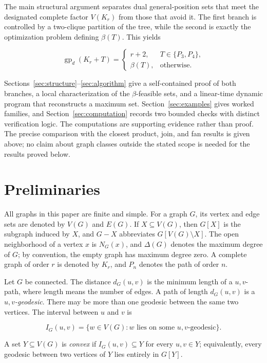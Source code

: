 \documentclass[11pt,a4paper]{article}
\numberwithin{equation}{section}
\begin{document}
The main structural argument separates dual general-position sets that
meet the designated complete factor \(V(K_r)\) from those that avoid it. The first
branch is controlled by a two-clique partition of the tree, while the
second is exactly the optimization problem defining \(\beta(T)\). This
yields

\[
\operatorname{gp}_d(K_r+T)=
\begin{cases}
r+2, & T\in\{P_3,P_4\},\\
\beta(T), & \text{otherwise}.
\end{cases}
\]

Sections~\ref{sec:structure}--\ref{sec:algorithm} give a self-contained proof of both branches, a local
characterization of the \(\beta\)-feasible sets, and a linear-time
dynamic program that reconstructs a maximum set. Section~\ref{sec:examples} gives worked
families, and Section~\ref{sec:computation} records two bounded checks with
distinct verification logic. The computations are supporting evidence rather
than proof. The precise comparison with the closest product, join, and fan
results is given above; no claim about graph classes outside the stated scope
is needed for the results proved below.

\section{Preliminaries}\label{sec:preliminaries}

All graphs in this paper are finite and simple. For a graph \(G\), its
vertex and edge sets are denoted by \(V(G)\) and \(E(G)\). If
\(X\subseteq V(G)\), then \(G[X]\) is the subgraph induced by \(X\), and
\(G-X\) abbreviates \(G[V(G)\setminus X]\). The open neighborhood of a
vertex \(x\) is \(N_G(x)\), and \(\Delta(G)\) denotes the maximum degree
of \(G\); by convention, the empty graph has maximum degree zero. A
complete graph of order \(r\) is denoted by \(K_r\), and
\(P_n\) denotes the path of order \(n\).

Let \(G\) be connected. The distance \(d_G(u,v)\) is the minimum length
of a \(u,v\)-path, where length means the number of edges. A path of
length \(d_G(u,v)\) is a \emph{\(u,v\)-geodesic}. There may be more than
one geodesic between the same two vertices. The interval between \(u\)
and \(v\) is

\[
I_G(u,v)=\{w\in V(G):w\text{ lies on some }u,v\text{-geodesic}\}.
\]

A set \(Y\subseteq V(G)\) is \emph{convex} if \(I_G(u,v)\subseteq Y\)
for every \(u,v\in Y\); equivalently, every geodesic between two
vertices of \(Y\) lies entirely in \(G[Y]\).
\end{document}
